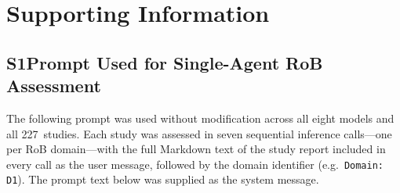 \documentclass[../main.tex]{subfiles}
\begin{document}
\section*{Supporting Information}
\label{sec:suppinfo}

\clearpage
\setcounter{figure}{0}
\renewcommand{\thefigure}{S\arabic{figure}}
\setcounter{table}{0}
\renewcommand{\thetable}{S\arabic{table}}
\setcounter{equation}{0}
\renewcommand{\theequation}{S\arabic{equation}}

\subsection*{S1\quad Prompt Used for Single-Agent RoB Assessment}
\label{sec:si-prompt}

The following prompt was used without modification across all eight models and all
227~studies.
Each study was assessed in seven sequential inference calls---one per RoB domain---with
the full Markdown text of the study report included in every call as the user message,
followed by the domain identifier (e.g.\ \texttt{Domain: D1}).
The prompt text below was supplied as the system message.
\end{document}
